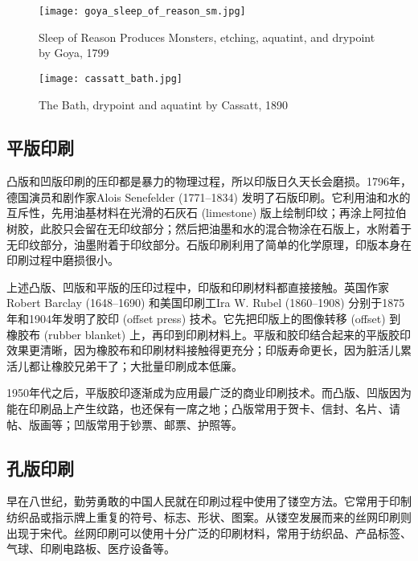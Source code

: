 \begin{figure}[htbp]
\centering
\begin{minipage}[t]{0.42\textwidth}
\centering
\texttt{[image: goya\_sleep\_of\_reason\_sm.jpg]}
\caption{Sleep of Reason Produces Monsters, etching, aquatint, and drypoint by Goya, 1799}
\label{fig:goya}
\end{minipage}
\hspace{5pt}
\begin{minipage}[t]{0.48\textwidth}
\centering
\texttt{[image: cassatt\_bath.jpg]}
\caption{The Bath, drypoint and aquatint by Cassatt, 1890}
\label{fig:cassatt}
\end{minipage}
\end{figure}

\subsection{平版印刷}

凸版和凹版印刷的压印都是暴力的物理过程，所以印版日久天长会磨损。1796年，德国演员和剧作家Alois Senefelder (1771--1834)\indexSenefelder{} 发明了石版印刷。它利用油和水的互斥性，先用油基材料在光滑的石灰石 (limestone) 版上绘制印纹；再涂上阿拉伯树胶，此胶只会留在无印纹部分；然后把油墨和水的混合物涂在石版上，水附着于无印纹部分，油墨附着于印纹部分。石版印刷利用了简单的化学原理，印版本身在印刷过程中磨损很小。

上述凸版、凹版和平版的压印过程中，印版和印刷材料都直接接触。英国作家Robert Barclay (1648--1690)\indexBarclay{} 和美国印刷工Ira W. Rubel (1860--1908) \indexRubel{}分别于1875年和1904年发明了胶印 (offset press) 技术。它先把印版上的图像转移 (offset) 到橡胶布 (rubber blanket) 上，再印到印刷材料上。平版和胶印结合起来的平版胶印效果更清晰，因为橡胶布和印刷材料接触得更充分；印版寿命更长，因为脏活儿累活儿都让橡胶兄弟干了；大批量印刷成本低廉。

1950年代之后，平版胶印逐渐成为应用最广泛的商业印刷技术。而凸版、凹版因为能在印刷品上产生纹路，也还保有一席之地；凸版常用于贺卡、信封、名片、请帖、版画等；凹版常用于钞票、邮票、护照等。

\subsection{孔版印刷}

早在八世纪，勤劳勇敢的中国人民就在印刷过程中使用了镂空方法。它常用于印制纺织品或指示牌上重复的符号、标志、形状、图案。从镂空发展而来的丝网印刷则出现于宋代。丝网印刷可以使用十分广泛的印刷材料，常用于纺织品、产品标签、气球、印刷电路板、医疗设备等。

